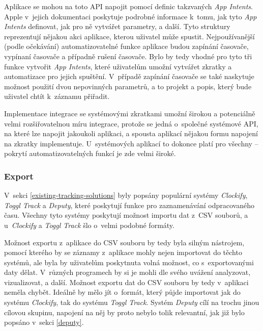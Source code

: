 Aplikace se mohou na toto API napojit pomocí definic takzvaných \emph{App Intents}. Apple v~jejich dokumentaci \cite{ios-app-intents} poskytuje podrobné informace k~tomu, jak tyto \emph{App Intents} definovat, jak pro ně vytvářet parametry, a další. Tyto struktury reprezentují nějakou akci aplikace, kterou uživatel může spustit. Nejpoužívanější (podle očekávání) automatizovatelné funkce aplikace budou zapínání časovače, vypínaní časovače a případně rušení časovače. Bylo by tedy vhodné pro tyto tři funkce vytvořit \emph{App Intents}, které uživatelům umožní vytvářet zkratky a automatizace pro jejich spuštění. V~případě zapínání časovače se také naskytuje možnost použití dvou nepovinných parametrů, a to projekt a popis, který bude uživatel chtít k~záznamu přiřadit.

Implementace integrace se systémovými zkratkami umožní širokou a potenciálně velmi rozšiřovatelnou míru integrace, protože se jedná o~společné systémové API, na které lze napojit jakoukoli aplikaci, a spousta aplikací nějakou formu napojení na zkratky implementuje. U~systémových aplikací to dokonce platí pro všechny – pokrytí automatizovatelných funkcí je zde velmi široké.

\subsubsection{Export}

V~sekci \ref{existing-tracking-solutions} byly popsány populární systémy \emph{Clockify}, \emph{Toggl Track} a \emph{Deputy}, které poskytují funkce pro zaznamenávání odpracovaného času. Všechny tyto systémy poskytují možnost importu dat z~CSV souborů, a u~\emph{Clockify} a \emph{Toggl Track} šlo o~velmi podobné formáty.

Možnost exportu z~aplikace do CSV souboru by tedy byla silným nástrojem, pomocí kterého by se záznamy z~aplikace mohly nejen importovat do těchto systémů, ale byla by uživatelům poskytnuta volná možnost, co s~exportovanými daty dělat. V~různých programech by si je mohli dle svého uvážení analyzovat, vizualizovat, a další. Možnost exportu dat do CSV souboru by tedy v~aplikaci neměla chybět. Ideálně by mělo jít o~formát, který půjde importovat jak do systému \emph{Clockify}, tak do systému \emph{Toggl Track}. Systém \emph{Deputy} cílí na trochu jinou cílovou skupinu, napojení na něj by proto nebylo tolik relevantní, jak již bylo popsáno v~sekci \ref{deputy}.

